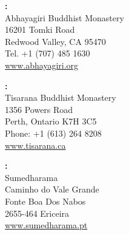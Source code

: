 {\vfill

\textbf{\MakeUppercase{\xUnitedStates}:} \\
Abhayagiri Buddhist Monastery\\
16201 Tomki Road\\
Redwood Valley, CA 95470\\
Tel. +1 (707) 485 1630\\
\href{http://www.abhayagiri.org}{www.abhayagiri.org}

\vfill

\textbf{\MakeUppercase{\xCanada}:} \\
Tisarana Buddhist Monastery\\
1356 Powers Road\\
Perth, Ontario K7H 3C5\\
Phone: +1 (613) 264 8208\\
\href{http://www.tisarana.ca}{www.tisarana.ca}

\vfill

\textbf{\MakeUppercase{\xPortugal}:}\\
Sumedharama\\
Caminho do Vale Grande\\
Fonte Boa Dos Nabos\\
2655-464 Ericeira\\
\href{http://sumedharama.pt}{www.sumedharama.pt}


}
